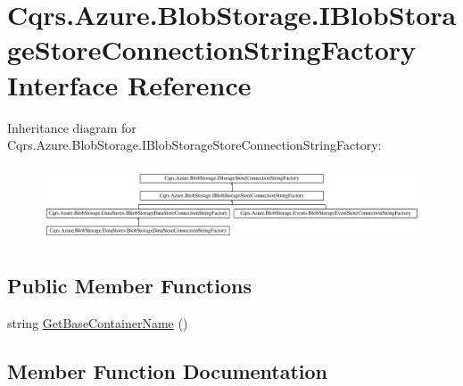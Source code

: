 \hypertarget{interfaceCqrs_1_1Azure_1_1BlobStorage_1_1IBlobStorageStoreConnectionStringFactory}{}\section{Cqrs.\+Azure.\+Blob\+Storage.\+I\+Blob\+Storage\+Store\+Connection\+String\+Factory Interface Reference}
\label{interfaceCqrs_1_1Azure_1_1BlobStorage_1_1IBlobStorageStoreConnectionStringFactory}
Inheritance diagram for Cqrs.\+Azure.\+Blob\+Storage.\+I\+Blob\+Storage\+Store\+Connection\+String\+Factory\+:\begin{figure}[H]
\begin{center}
\leavevmode
\includegraphics[height=2.258065cm]{interfaceCqrs_1_1Azure_1_1BlobStorage_1_1IBlobStorageStoreConnectionStringFactory}
\end{center}
\end{figure}
\subsection*{Public Member Functions}
\begin{DoxyCompactItemize}
\item 
string \hyperlink{interfaceCqrs_1_1Azure_1_1BlobStorage_1_1IBlobStorageStoreConnectionStringFactory_a57145e68e3bda84bc610fa61226a850c_a57145e68e3bda84bc610fa61226a850c}{Get\+Base\+Container\+Name} ()
\end{DoxyCompactItemize}


\subsection{Member Function Documentation}
\mbox{\label{interfaceCqrs_1_1Azure_1_1BlobStorage_1_1IBlobStorageStoreConnectionStringFactory_a57145e68e3bda84bc610fa61226a850c_a57145e68e3bda84bc610fa61226a850c}} 
